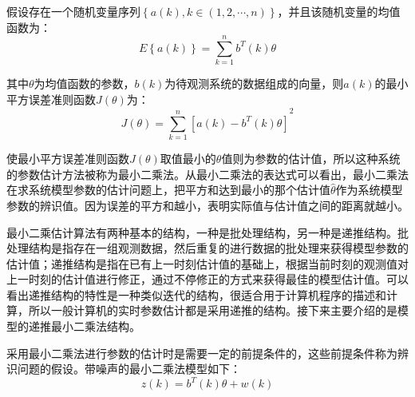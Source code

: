 假设存在一个随机变量序列$\left\{ a\left( k \right),k\in \left( 1,2,\cdots ,n \right) \right\}$，并且该随机变量的均值函数为：
\begin{equation}
E\left\{ a\left( k \right) \right\}=\sum\limits_{k=1}^{n}{{{b}^{T}}\left( k \right)\theta }
\end{equation}

其中$\theta $为均值函数的参数，$b\left( k \right)$为待观测系统的数据组成的向量，则$a\left( k \right)$的最小平方误差准则函数$J\left( \theta  \right)$为：
\begin{equation}
J\left( \theta  \right)={{\sum\limits_{k=1}^{n}{\left[ a(k)-{{b}^{T}}(k)\theta  \right]}}^{2}}
\end{equation}

使最小平方误差准则函数$J\left( \theta  \right)$取值最小的$\theta$值则为参数的估计值，所以这种系统的参数估计方法被称为最小二乘法。从最小二乘法的表达式可以看出，最小二乘法在求系统模型参数的估计问题上，把平方和达到最小的那个估计值$\hat{\theta }$作为系统模型参数的辨识值。因为误差的平方和越小，表明实际值与估计值之间的距离就越小。

最小二乘估计算法有两种基本的结构，一种是批处理结构，另一种是递推结构。批处理结构是指存在一组观测数据，然后重复的进行数据的批处理来获得模型参数的估计值；递推结构是指在已有上一时刻估计值的基础上，根据当前时刻的观测值对上一时刻的估计值进行修正，通过不停修正的方式来获得最佳的模型估计值。可以看出递推结构的特性是一种类似迭代的结构，很适合用于计算机程序的描述和计算，所以一般计算机的实时参数估计都是采用递推的结构。接下来主要介绍的是模型的递推最小二乘法结构。

采用最小二乘法进行参数的估计时是需要一定的前提条件的，这些前提条件称为辨识问题的假设。带噪声的最小二乘法模型如下：
\begin{equation}
z\left( k \right)={{b}^{T}}(k)\theta +w(k)
\end{equation}

